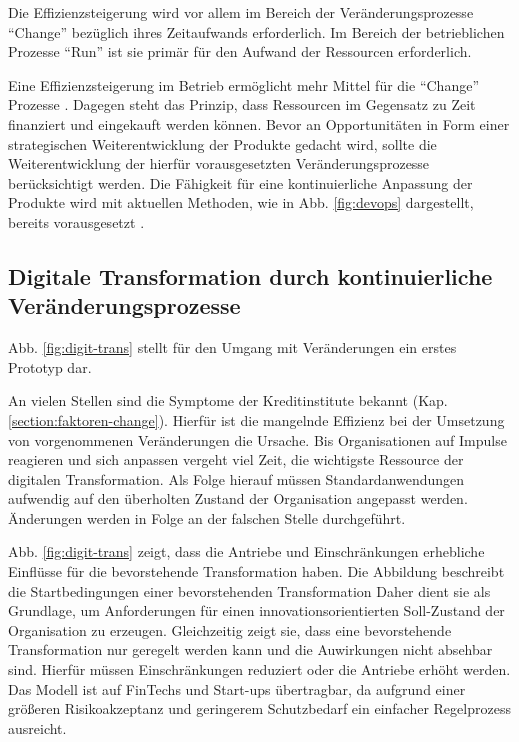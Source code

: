 \begin{enumerate}
    Die Effizienzsteigerung wird vor allem im Bereich der Veränderungsprozesse \enquote{Change} bezüglich ihres Zeitaufwands erforderlich. Im Bereich der betrieblichen Prozesse \enquote{Run} ist sie primär für den Aufwand der Ressourcen erforderlich.
    
    Eine Effizienzsteigerung im Betrieb ermöglicht mehr Mittel für die \enquote{Change} Prozesse \cite{Rausch2006}. Dagegen steht das Prinzip, dass Ressourcen im Gegensatz zu Zeit finanziert und eingekauft werden können. Bevor an Opportunitäten in Form einer strategischen Weiterentwicklung der Produkte \cite{Rausch2006} gedacht wird, sollte die Weiterentwicklung der hierfür vorausgesetzten Veränderungsprozesse berücksichtigt werden. Die Fähigkeit für eine kontinuierliche Anpassung \cite{Bussmann2006, Ganswindt2006} der Produkte wird mit aktuellen Methoden, wie in Abb. \ref{fig:devops} dargestellt, bereits vorausgesetzt \cite{Alt2017}.

\end{enumerate}


\subsection{Digitale Transformation durch kontinuierliche Veränderungsprozesse}
 
Abb. \ref{fig:digit-trans} stellt für den Umgang mit Veränderungen ein erstes Prototyp dar.
 
An vielen Stellen sind die Symptome der Kreditinstitute bekannt (Kap. \ref{section:faktoren-change}). Hierfür ist die mangelnde Effizienz bei der Umsetzung von vorgenommenen Veränderungen die Ursache. Bis Organisationen auf Impulse reagieren und sich anpassen vergeht viel Zeit, die wichtigste Ressource der digitalen Transformation. Als Folge hierauf müssen Standardanwendungen aufwendig auf den überholten Zustand der Organisation angepasst werden. Änderungen werden in Folge an der falschen Stelle durchgeführt. 

Abb. \ref{fig:digit-trans} zeigt, dass die Antriebe und Einschränkungen erhebliche Einflüsse für die bevorstehende Transformation haben. Die Abbildung beschreibt die Startbedingungen einer bevorstehenden Transformation
Daher dient sie als Grundlage, um Anforderungen für einen innovationsorientierten Soll-Zustand der Organisation zu erzeugen.
Gleichzeitig zeigt sie, dass eine bevorstehende Transformation nur geregelt werden kann und die Auwirkungen nicht absehbar sind. Hierfür müssen Einschränkungen reduziert oder die Antriebe erhöht werden. Das Modell ist auf FinTechs und Start-ups übertragbar, da aufgrund einer größeren Risikoakzeptanz und geringerem Schutzbedarf ein einfacher Regelprozess ausreicht.

